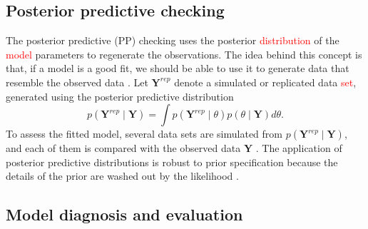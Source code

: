 \documentclass[a4paper]{article}   	%
\begin{document}
	
	\subsection{Posterior predictive checking}
	
	
	The posterior predictive (PP) checking uses the posterior \textcolor{red}{distribution} of the \textcolor{red}{model} parameters to regenerate the observations. The idea behind this concept is that, if a model is a good fit, we should be able to use it to generate data that resemble the observed data \parencite{gabry2019Visualization}. Let $\bm{Y}^{rep}$ denote a simulated or replicated data \textcolor{red}{set}, generated using the posterior predictive distribution 
	\begin{equation}\label{eq:PredPost}
		p(\bm{Y}^{rep} \mid \bm{Y}) = \int p(\bm{Y}^{rep} \mid \theta)p(\theta \mid \bm{Y}) d\theta. 
	\end{equation}
	To assess the fitted model, several data sets are simulated from 	$p(\bm{Y}^{rep} \mid \bm{Y})$, and each of them is compared with the observed data $\bm{Y}$ \parencite{dipakdey2005Bayesian, Congdon2019Bayesian}. The application of posterior predictive distributions is robust to prior specification because the details of the prior are washed out by the likelihood \parencite{gelman2017Prior}.
	
	
	
	\subsection{Model diagnosis and evaluation}
	
\end{document}
